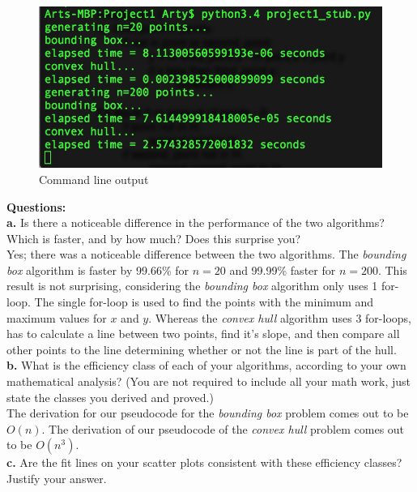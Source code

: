 \documentclass[09pt]{article}
\begin{document}
\begin{figure}[h]
\centering
\includegraphics[scale=0.67]{CommandLineOutput}
\caption{Command line output}
\end{figure}

\noindent
\textbf{Questions:} \\
\textbf{a.} Is there a noticeable difference in the performance of the two algorithms? Which is faster, and by how much? Does this surprise you? \\

\hangindent=0.2in
Yes; there was a noticeable difference between the two algorithms.  The \emph{bounding box} algorithm is faster by 99.66\% for $n = 20$ and 99.99\% faster for $n=200$.  This result is not surprising, considering the \emph{bounding box} algorithm only uses 1 for-loop. The single for-loop is used to find the points with the minimum and maximum values for $x$ and $y$.  Whereas the \emph{convex hull} algorithm uses 3 for-loops, has to calculate a line between two points, find it's slope, and then compare all other points to the line determining whether or not the line is part of the hull.\\

\noindent
\textbf{b.} What is the efficiency class of each of your algorithms, according to your own mathematical analysis? (You are not required to include all your math work, just state the classes you derived and proved.) \\

\hangindent=0.2in
The derivation for our pseudocode for the \emph{bounding box} problem comes out to be $O(n)$.  The derivation of our pseudocode of the \emph{convex hull} problem comes out to be $O(n^3)$. \\

\noindent
\textbf{c.} Are the fit lines on your scatter plots consistent with these efficiency classes? Justify your answer. \\
\end{document}
